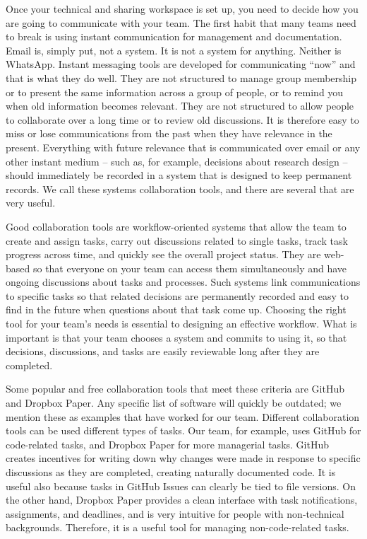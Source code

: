 Once your technical and sharing workspace is set up,
you need to decide how you are going to communicate with your team.
The first habit that many teams need to break
is using instant communication for management and documentation.
Email is, simply put, not a system. It is not a system for anything. Neither is WhatsApp.
Instant messaging tools are developed for communicating ``now'' and that is what they do well.
They are not structured to manage group membership or to present the same information
across a group of people, or to remind you when old information becomes relevant.
They are not structured to allow people to collaborate over a long time or to review old discussions.
It is therefore easy to miss or lose communications from the past when they have relevance in the present.
Everything with future relevance that is communicated over email or any other instant medium
-- such as, for example, decisions about research design --
should immediately be recorded in a system that is designed to keep permanent records.
We call these systems collaboration tools, and there are several that are very useful.

Good collaboration tools are workflow-oriented systems
that allow the team to create and assign tasks,
carry out discussions related to single tasks,
track task progress across time, and quickly see the overall project status.
They are web-based so that everyone on your team can access them simultaneously
and have ongoing discussions about tasks and processes.
Such systems link communications to specific tasks so that
related decisions are permanently recorded
and easy to find in the future when questions about that task come up.
Choosing the right tool for your team's needs is essential to designing an effective workflow.
What is important is that your team chooses a system and commits to using it,
so that decisions, discussions, and tasks are easily reviewable long after they are completed.

Some popular and free collaboration tools that meet these criteria are
GitHub and Dropbox Paper.
Any specific list of software will quickly be outdated;
we mention these as examples that have worked for our team.
Different collaboration tools can be used different types of tasks.
Our team, for example, uses GitHub for code-related tasks,
and Dropbox Paper for more managerial tasks.
GitHub creates incentives for writing down why changes were made
in response to specific discussions
as they are completed, creating naturally documented code.
It is useful also because tasks in GitHub Issues can clearly be tied to file versions.
On the other hand, Dropbox Paper provides a clean interface with task notifications,
assignments, and deadlines,
and is very intuitive for people with non-technical backgrounds.
Therefore, it is a useful tool for managing non-code-related tasks.

